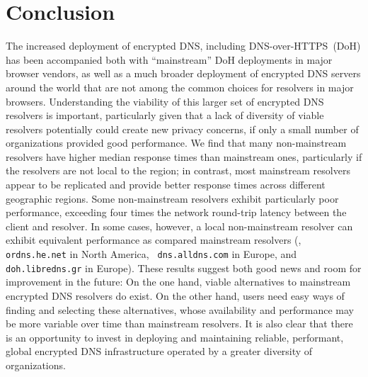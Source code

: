 \section{Conclusion}\label{sec:conclusion}

The increased deployment of encrypted DNS, including DNS-over-HTTPS~(DoH) has
been accompanied both with ``mainstream'' DoH deployments in major browser
vendors, as well as a much broader deployment of encrypted DNS servers around
the world that are not among the common choices for resolvers in major
browsers.  Understanding the viability of this larger set of encrypted DNS
resolvers is important, particularly given that a lack of diversity of viable
resolvers potentially could create new privacy concerns, if only a small
number of organizations provided good performance. We find that many
non-mainstream resolvers have higher median response times than mainstream
ones, particularly if the resolvers are not local to the region; in contrast,
most mainstream resolvers appear to be replicated and provide better response
times across different geographic regions. Some non-mainstream resolvers
exhibit particularly poor performance, exceeding four times the network
round-trip latency between the client and resolver. In some cases, however, a
local non-mainstream resolver can exhibit equivalent performance as compared
mainstream resolvers (\eg, {\tt ordns.he.net} in North America, {\tt
dns.alldns.com} in Europe, and {\tt doh.libredns.gr} in Europe). These results
suggest both good news and room for improvement in the future: On the one
hand, viable alternatives to mainstream encrypted DNS resolvers do exist.  On
the other hand, users need easy ways of finding and selecting these
alternatives, whose availability and performance may be more variable over
time than mainstream resolvers. It is also clear that there is an opportunity
to invest in deploying and maintaining reliable, performant, global encrypted
DNS infrastructure operated by a greater diversity of organizations.

